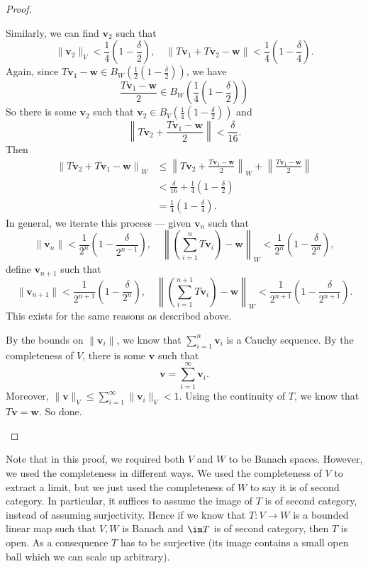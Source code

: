 \documentclass[a4paper]{article}
\begin{document}
\begin{proof}
\begin{enumerate}
      Similarly, we can find $\mathbf{v}_2$ such that
      \[
        \|\mathbf{v}_2\|_V < \frac{1}{4}\left(1 - \frac{\delta}{2}\right), \quad \|T\mathbf{v}_1 + T\mathbf{v}_2 - \mathbf{w}\| < \frac{1}{4}\left(1 - \frac{\delta}{4}\right).
      \]
      Again, since $T \mathbf{v}_1 - \mathbf{w} \in B_W\left(\frac{1}{2}\left(1 - \frac{\delta}{2}\right)\right)$, we have
      \[
        \frac{T\mathbf{v}_1 - \mathbf{w}}{2}\in B_W\left(\frac{1}{4}\left(1 - \frac{\delta}{2}\right)\right)
      \]
      So there is some $\mathbf{v}_2$ such that $\mathbf{v}_2 \in B_V\left(\frac{1}{4}\left(1 - \frac{\delta}{2}\right)\right)$ and
      \[
        \left\|T\mathbf{v}_2 + \frac{T\mathbf{v}_1 - \mathbf{w}}{2}\right\| < \frac{\delta}{16}.
      \]
      Then
      \begin{align*}
        \left\|T\mathbf{v}_2 + T\mathbf{v}_1 - \mathbf{w}\right\|_W &\leq \left\|T\mathbf{v}_2 + \frac{T\mathbf{v}_1 - \mathbf{w}}{2}\right\|_W + \left\|\frac{T\mathbf{v}_1 - \mathbf{w}}{2}\right\| \\
        &< \frac{\delta}{16} + \frac{1}{4}\left(1 - \frac{\delta}{2}\right) \\
        &= \frac{1}{4}\left(1 - \frac{\delta}{4}\right).
      \end{align*}
      In general, we iterate this process --- given $\mathbf{v}_n$ such that
      \[
        \|\mathbf{v}_n\| < \frac{1}{2^n}\left(1 - \frac{\delta}{2^{n - 1}}\right),\quad \left\|\left(\sum_{i = 1}^n T\mathbf{v}_i\right) - \mathbf{w}\right\|_W < \frac{1}{2^n} \left(1 - \frac{\delta}{2^n}\right),
      \]
      define $\mathbf{v}_{n + 1}$ such that
      \[
        \|\mathbf{v}_{n + 1}\| < \frac{1}{2^{n + 1}}\left(1 - \frac{\delta}{2^n}\right),\quad \left\|\left(\sum_{i = 1}^{n + 1} T\mathbf{v}_i\right) - \mathbf{w}\right\|_W < \frac{1}{2^{n + 1}} \left(1 - \frac{\delta}{2^{n + 1}}\right).
      \]
      This exists for the same reasons as described above.

      By the bounds on $\|\mathbf{v}_i\|$, we know that $\sum_{i = 1}^n \mathbf{v}_i$ is a Cauchy sequence. By the completeness of $V$, there is some $\mathbf{v}$ such that
      \[
        \mathbf{v} = \sum_{i = 1}^\infty \mathbf{v}_i.
      \]
      Moreover, $\|\mathbf{v}\|_V \leq \sum_{i = 1}^\infty \|\mathbf{v}_i\|_V < 1$. Using the continuity of $T$, we know that $T\mathbf{v} = \mathbf{w}$. So done.
  \end{enumerate}
\end{proof}
Note that in this proof, we required both $V$ and $W$ to be Banach spaces. However, we used the completeness in different ways. We used the completeness of $V$ to extract a limit, but we just used the completeness of $W$ to say it is of second category. In particular, it suffices to assume the image of $T$ is of second category, instead of assuming surjectivity. Hence if we know that $T: V\to W$ is a bounded linear map such that $V, W$ is Banach and $\im T$ is of second category, then $T$ is open. As a consequence $T$ has to be surjective (its image contains a small open ball which we can scale up arbitrary).
\end{document}
